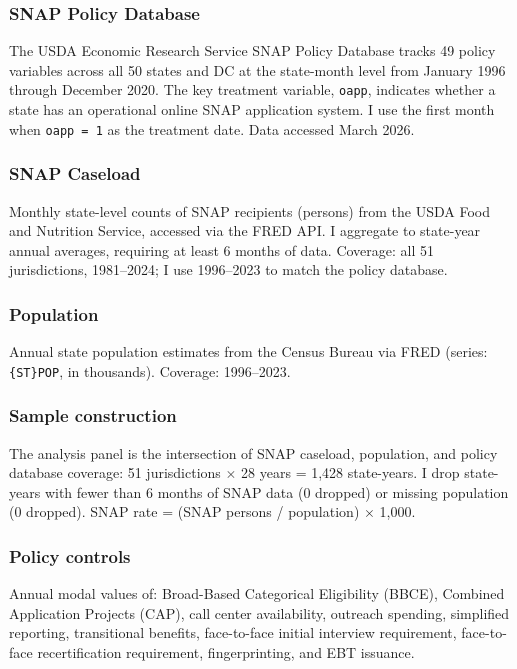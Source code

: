 \documentclass[12pt]{article}
\begin{document}
\subsubsection*{SNAP Policy Database} The USDA Economic Research Service SNAP Policy Database tracks 49 policy variables across all 50 states and DC at the state-month level from January 1996 through December 2020. The key treatment variable, \texttt{oapp}, indicates whether a state has an operational online SNAP application system. I use the first month when \texttt{oapp = 1} as the treatment date. Data accessed March 2026.

\subsubsection*{SNAP Caseload} Monthly state-level counts of SNAP recipients (persons) from the USDA Food and Nutrition Service, accessed via the FRED API. I aggregate to state-year annual averages, requiring at least 6 months of data. Coverage: all 51 jurisdictions, 1981--2024; I use 1996--2023 to match the policy database.

\subsubsection*{Population} Annual state population estimates from the Census Bureau via FRED (series: \texttt{\{ST\}POP}, in thousands). Coverage: 1996--2023.

\subsubsection*{Sample construction} The analysis panel is the intersection of SNAP caseload, population, and policy database coverage: 51 jurisdictions $\times$ 28 years = 1,428 state-years. I drop state-years with fewer than 6 months of SNAP data (0 dropped) or missing population (0 dropped). SNAP rate = (SNAP persons / population) $\times$ 1,000.

\subsubsection*{Policy controls} Annual modal values of: Broad-Based Categorical Eligibility (BBCE), Combined Application Projects (CAP), call center availability, outreach spending, simplified reporting, transitional benefits, face-to-face initial interview requirement, face-to-face recertification requirement, fingerprinting, and EBT issuance.
\end{document}
